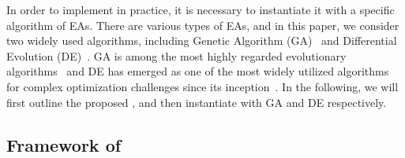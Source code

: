 In order to implement \modelname in practice, it is necessary to instantiate it with a specific algorithm of EAs. There are various types of EAs, and in this paper, we consider two widely used algorithms, including Genetic Algorithm (GA)~\citep{holland1975adaptation} and Differential Evolution (DE)~\citep{storn1997differential}. GA is among the most highly regarded evolutionary algorithms~\citep{holland1975adaptation,holland1992adaptation,mitchell1998introduction,mirjalili2020genetic} and DE has emerged as one of the most widely utilized algorithms for complex optimization challenges since its inception~\citep{storn1997differential,price2013differential,das2010differential,pant2020differential}. In the following, we will first outline the proposed \modelname, and then instantiate \modelname with GA and DE respectively.













\subsection{Framework of \modelname}












 





